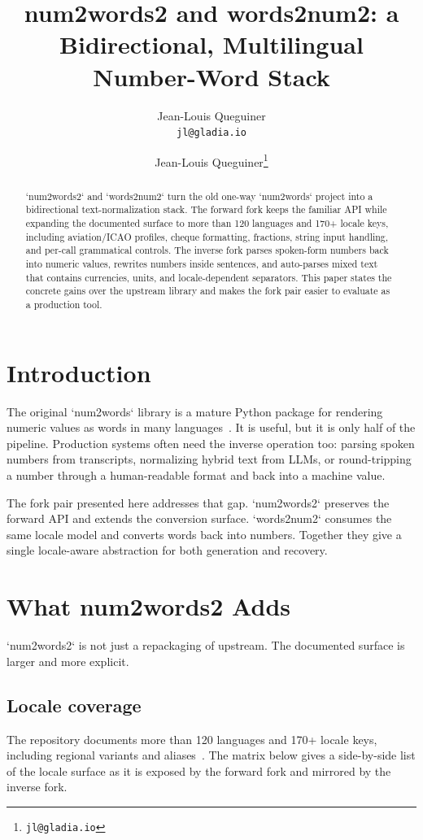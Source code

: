 \documentclass{article}
\title{num2words2 and words2num2: a Bidirectional, Multilingual Number-Word Stack}
\author{Jean-Louis Queguiner\\
\texttt{jl@gladia.io}}
\author[1]{Jean-Louis Queguiner\thanks{\texttt{jl@gladia.io}}}
\affil[1]{Gladia}
\begin{document}
\maketitle

\begin{abstract}
`num2words2` and `words2num2` turn the old one-way `num2words` project into a
bidirectional text-normalization stack. The forward fork keeps the familiar API
while expanding the documented surface to more than 120 languages and 170+
locale keys, including aviation/ICAO profiles, cheque formatting, fractions,
string input handling, and per-call grammatical controls. The inverse fork
parses spoken-form numbers back into numeric values, rewrites numbers inside
sentences, and auto-parses mixed text that contains currencies, units, and
locale-dependent separators. This paper states the concrete gains over the
upstream library and makes the fork pair easier to evaluate as a production
tool.
\end{abstract}


\section{Introduction}
The original `num2words` library is a mature Python package for rendering
numeric values as words in many languages~\cite{num2words_upstream}. It is
useful, but it is only half of the pipeline. Production systems often need the
inverse operation too: parsing spoken numbers from transcripts, normalizing
hybrid text from LLMs, or round-tripping a number through a human-readable
format and back into a machine value.

The fork pair presented here addresses that gap. `num2words2` preserves the
forward API and extends the conversion surface. `words2num2` consumes the same
locale model and converts words back into numbers. Together they give a single
locale-aware abstraction for both generation and recovery.

\section{What num2words2 Adds}
`num2words2` is not just a repackaging of upstream. The documented surface is
larger and more explicit.

\subsection{Locale coverage}
The repository documents more than 120 languages and 170+ locale keys,
including regional variants and aliases~\cite{num2words2_reference}. The matrix
below gives a side-by-side list of the locale surface as it is exposed by the
forward fork and mirrored by the inverse fork.
\end{document}
